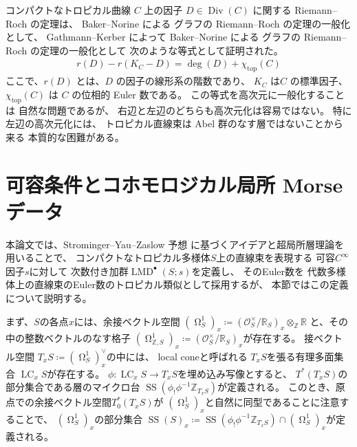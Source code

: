 \documentclass[uplatex,dvipdfmx,12pt]{jsarticle}
\numberwithin{equation}{section}
\theoremstyle{definition}
\newcommand{\deq}{\coloneqq}
\newcommand{\opn}[1]{\operatorname{#1}}
\newcommand{\beforesection}{\vspace{-15pt}}
\newcommand{\aftersection}{\vspace{-8pt}}
\DeclareMathOperator{\tform}{\Omega}
\begin{document}
コンパクトなトロピカル曲線 $C$ 上の因子 
$D\in \opn{Div}(C)$
に関する Riemann--Roch の定理は、
Baker--Norine による
グラフの Riemann--Roch の定理の一般化として、
Gathmann--Kerber
\cite{gathmannRiemannRochTheoremTropical2008a} によって 
Baker--Norine による
グラフの Riemann--Roch の定理の一般化として
次のような等式として証明された。
\begin{align} \label{equation-tropical-rr}
r(D)-r(K_C-D)=\opn{deg}(D)+\chi_{\mathrm{top}}(C)
\end{align}
ここで、$r(D)$ とは、$D$ の因子の線形系の階数であり、
$K_C$ は$C$ の標準因子、$\chi_{\mathrm{top}}(C)$ は
$C$ の位相的 Euler 数である。
この等式を高次元に一般化することは
自然な問題であるが、
右辺と左辺のどちらも高次元化は容易ではない。
特に左辺の高次元化には、
トロピカル直線束は Abel 群のなす層ではないことから来る
本質的な困難がある。

\beforesection

\section{可容条件とコホモロジカル局所 Morse データ}

\aftersection

本論文では、Strominger--Yau--Zaslow 予想
\cite{stromingerMirrorSymmetryTduality1996}
に基づくアイデアと超局所層理論\cite{MR1299726}を
用いることで、
コンパクトなトロピカル多様体$S$上の直線束を表現する 
可容$C^{\infty}$因子$s$に対して
次数付き加群$\opn{LMD}^{\bullet}(S;s)$を定義し、
そのEuler数を
代数多様体上の直線束のEuler数のトロピカル類似として採用するが、
本節ではこの定義について説明する。

まず、$S$の各点$x$には、余接ベクトル空間
$(\tform^{1}_{S})_x\deq
(\mathcal{O}_S^{\times}/\mathbb{R}_S)_x
\otimes_{\mathbb{Z}}\mathbb{R}$
と、その中の整数ベクトルのなす格子
$(\tform^{1}_{\mathbb{Z},S})_x\deq
(\mathcal{O}_S^{\times}/\mathbb{R}_S)_x$が存在する。
接ベクトル空間
$T_x S\deq(\tform^{1}_{S})_x^{\vee}$の中には、
local coneと呼ばれる
$T_xS$を張る有理多面集合
$\opn{LC}_x S$が存在する。
$\phi \colon \opn{LC}_x S\to T_x S$を埋め込み写像とすると、
$T^{*}(T_xS)$の部分集合である層のマイクロ台
$\opn{SS}(\phi_!\phi^{-1}\mathbb{Z}_{T_xS})$が定義される。
このとき、原点での余接ベクトル空間$T^{*}_0(T_xS)$が
$(\tform_S^{1})_x$と自然に同型であることに注意することで、
$(\tform_S^{1})_x$の部分集合
$\opn{SS}(S)_x\deq \opn{SS}(\phi_!\phi^{-1}\mathbb{Z}_{T_xS})
\cap (\tform_S^{1})_x$が定義される。
\end{document}
